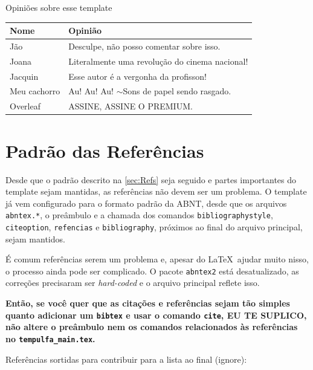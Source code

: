 \begin{quadro}[h]
\centering
\caption{Opiniões sobre esse template}\label{quad:exemplo}
  \begin{tabular}{|l|p{9cm}|}
    \hline 
    \rowcolor[gray]{.9}
    \bf Nome& \bf Opinião\\
    \hline
    Jão& Desculpe, não posso comentar sobre isso.\\
    \hline
    Joana& Literalmente uma revolução do cinema nacional!\\
    \hline
    Jacquin& Esse autor é a vergonha da profisson!\\
    \hline
    Meu cachorro& Au! Au! Au! $\sim$Sons de papel sendo rasgado.\\
    \hline
    Overleaf& ASSINE, ASSINE O PREMIUM.\\
    \hline
    \end{tabular}
    
    \vspace{0.3cm}
\end{quadro}


\section{Padrão das Referências}

Desde que o padrão descrito na \autoref{sec:Refs} seja seguido e partes importantes do template sejam mantidas, as referências não devem ser um problema. O template já vem configurado para o formato padrão da ABNT, desde que os arquivos \texttt{abntex.*}, o preâmbulo e a chamada dos comandos \texttt{bibliographystyle}, \texttt{citeoption}, \texttt{refencias} e \texttt{bibliography}, próximos ao final do arquivo principal, sejam mantidos.

É comum referências serem um problema e, apesar do \LaTeX\ ajudar muito nisso, o processo ainda pode ser complicado. O pacote \texttt{abntex2} está desatualizado, as correções precisaram ser \emph{hard-coded} e o arquivo principal reflete isso.

\textbf{Então, se você quer que as citações e referências sejam tão simples quanto adicionar um \texttt{bibtex} e usar o comando \texttt{cite}, EU TE SUPLICO, não altere o preâmbulo nem os comandos relacionados às referências no \texttt{tempulfa\_main.tex}.}

Referências sortidas para contribuir para a lista ao final (ignore): \cite{Eco1996,Booth2000,BIB2010,Hexsel2004,Franca2001,Gil2002,Porto2002,Silva2005,UFLA:2015,Moura1998,NBR6023:2002}

